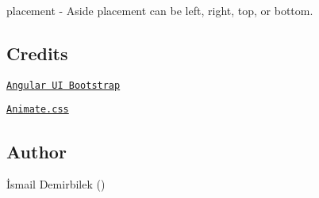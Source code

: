 \begin{DoxyItemize}
\item {\ttfamily placement} -\/ Aside placement can be {\ttfamily \textquotesingle{}left\textquotesingle{}}, {\ttfamily \textquotesingle{}right\textquotesingle{}}, {\ttfamily \textquotesingle{}top\textquotesingle{}}, or {\ttfamily \textquotesingle{}bottom\textquotesingle{}}.
\end{DoxyItemize}

\subsection*{Credits}


\begin{DoxyItemize}
\item \href{angular-ui.github.io/bootstrap/}{\tt Angular UI Bootstrap}
\item \href{http://daneden.github.io/animate.css/}{\tt Animate.\+css}
\end{DoxyItemize}

\subsection*{Author}

İsmail Demirbilek (\href{https://twitter.com/dbtek}{\tt }) 
